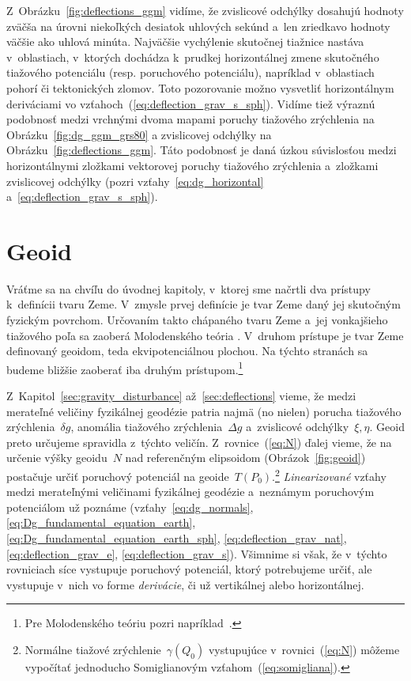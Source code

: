 \documentclass[a4paper, 12pt]{book}
\begin{document}
Z~Obrázku~\ref{fig:deflections_ggm} vidíme, že zvislicové odchýlky dosahujú 
hodnoty zväčša na úrovni niekoľkých desiatok uhlových sekúnd a~len zriedkavo 
hodnoty väčšie ako uhlová minúta.  Najväčšie vychýlenie skutočnej tiažnice 
nastáva v~oblastiach, v~ktorých dochádza k~prudkej horizontálnej zmene 
skutočného tiažového potenciálu (resp. poruchového potenciálu), napríklad 
v~oblastiach pohorí či tektonických zlomov.  Toto pozorovanie možno vysvetliť 
horizontálnym deriváciami vo vzťahoch~(\ref{eq:deflection_grav_s_sph}).  Vidíme 
tiež výraznú podobnosť medzi vrchnými dvoma mapami poruchy tiažového zrýchlenia 
na Obrázku~\ref{fig:dg_ggm_grs80} a zvislicovej odchýlky na 
Obrázku~\ref{fig:deflections_ggm}.  Táto podobnosť je daná úzkou súvislosťou 
medzi horizontálnymi zložkami vektorovej poruchy tiažového zrýchlenia 
a~zložkami zvislicovej odchýlky (pozri vzťahy~\ref{eq:dg_horizontal} 
a~\ref{eq:deflection_grav_s_sph}).







\chapter{Geoid}
\label{sec:geoid}

Vráťme sa na chvíľu do úvodnej kapitoly, v~ktorej sme načrtli dva prístupy 
k~definícii tvaru Zeme.  V~zmysle prvej definície je tvar Zeme daný jej 
skutočným fyzickým povrchom.  Určovaním takto chápaného tvaru Zeme a~jej 
vonkajšieho tiažového poľa sa zaoberá Molodenského teória 
\parencite{Molodensky1962,Borre_chapter8,MoritzAdvancedGeodesy,MoritzPhysicalGeodesy}.  
V~druhom prístupe je tvar Zeme definovaný geoidom, teda ekvipotenciálnou 
plochou.  Na týchto stranách sa budeme bližšie zaoberať iba druhým 
prístupom.\footnote{Pre Molodenského teóriu pozri 
napríklad~\textcite{Janak2006}.}

Z~Kapitol~\ref{sec:gravity_disturbance} až~\ref{sec:deflections} vieme, že 
medzi merateľné veličiny fyzikálnej geodézie patria najmä (no nielen) porucha 
tiažového zrýchlenia~$\delta g$, anomália tiažového zrýchlenia~$\Delta g$ 
a~zvislicové odchýlky~$\xi, \eta$.  Geoid preto určujeme spravidla z~týchto 
veličín.  Z~rovnice~(\ref{eq:N}) ďalej vieme, že na určenie výšky geoidu~$N$ 
nad referenčným elipsoidom (Obrázok~\ref{fig:geoid}) postačuje určiť poruchový 
potenciál na geoide~$T(P_0)$.\footnote{Normálne tiažové 
zrýchlenie~$\gamma(Q_0)$ vystupujúce v~rovnici~(\ref{eq:N}) môžeme vypočítať 
jednoducho Somiglianovým vzťahom~(\ref{eq:somigliana}).}  \emph{Linearizované} 
vzťahy medzi merateľnými veličinami fyzikálnej geodézie a~neznámym poruchovým 
potenciálom už poznáme (vzťahy~\ref{eq:dg_normals}, 
\ref{eq:Dg_fundamental_equation_earth}, 
\ref{eq:Dg_fundamental_equation_earth_sph}, \ref{eq:deflection_grav_nat}, 
\ref{eq:deflection_grav_e}, \ref{eq:deflection_grav_s}).  Všimnime si však, že 
v~týchto rovniciach síce vystupuje poruchový potenciál, ktorý potrebujeme 
určiť, ale vystupuje v~nich vo forme \emph{derivácie}, či už vertikálnej alebo 
horizontálnej.
\end{document}
